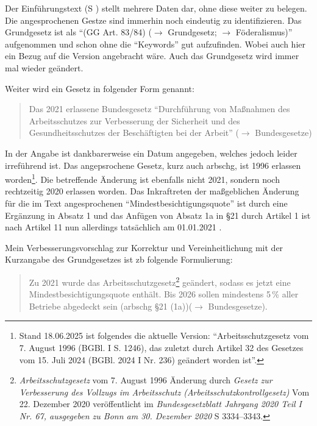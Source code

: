 Der Einführungstext (\gls{S} \pageref{DEMOKRATIE-A1}) stellt mehrere Daten dar, ohne diese weiter zu belegen.
Die angesprochenen Gestze sind immerhin noch eindeutig zu identifizieren. Das Grundgesetz ist als \enquote{(GG Art. 83/84) ($\rightarrow$ Grundgesetz; $\rightarrow$ Föderalismus)} aufgenommen und schon ohne die \enquote{Keywords} gut aufzufinden. Wobei auch hier ein Bezug auf die Version angebracht wäre. Auch das Grundgesetz wird immer mal wieder geändert.  

Weiter wird ein Gesetz in folgender Form genannt: 
\begin{quote}
    Das 2021 erlassene Bundesgesetz \enquote{Durchführung von Maßnahmen des Arbeitsschutzes zur  Verbesserung der Sicherheit und des Gesundheitsschutzes der Beschäftigten bei der Arbeit} ($\rightarrow$ Bundesgesetze)
\end{quote}

In der Angabe ist dankbarerweise ein Datum angegeben, welches jedoch leider irreführend ist. Das angepsrochene Gesetz, kurz auch \gls{arbschg}, ist 1996 erlassen worden\footnote{Stand 18.06.2025 ist folgendes die aktuelle Version: \enquote{Arbeitsschutzgesetz vom 7. August 1996 (BGBl. I S. 1246), das zuletzt durch Artikel 32 des Gesetzes vom 15. Juli 2024 (BGBl. 2024 I Nr. 236) geändert worden ist}.}. Die betreffende Änderung ist ebenfalls nicht 2021, sondern noch rechtzeitig 2020 erlassen worden. Das Inkraftreten der maßgeblichen Änderung für die im Text angesprochenen \enquote{Mindestbesichtigungsquote} ist durch eine Ergänzung in Absatz 1 und das Anfügen von Absatz 1a in §21 %
durch Artikel 1 ist nach Artikel 11 nun allerdings tatsächlich am 01.01.2021 \autocite[3334–3343]{BGBl.2020-I-Nr67}. 

Mein Verbesserungsvorschlag zur Korrektur und Vereinheitlichung mit der Kurzangabe des Grundgesetzes ist \gls{zb} folgende Formulierung:
\begin{quote}
Zu 2021 wurde das Arbeitsschutzgesetz\footnote{
    \emph{Arbeitsschutzgesetz} vom 7. August 1996 Änderung durch \emph{Gesetz zur Verbesserung des Vollzugs im Arbeitsschutz (Arbeitsschutzkontrollgesetz)} Vom 22. Dezember 2020 veröffentlicht im \emph{Bundesgesetzblatt Jahrgang 2020 Teil I Nr. 67, ausgegeben zu Bonn am 30. Dezember 2020} \gls{S} 3334–3343.\label{ArbschSchGfooty}} 
    geändert, sodass es jetzt eine Mindestbesichtigungsquote enthält. %
    Bis 2026 sollen mindestens 5\,\% aller Betriebe abgedeckt sein (\gls{arbschg} §21 (1a))($\rightarrow$ Bundesgesetze). 
\end{quote}

